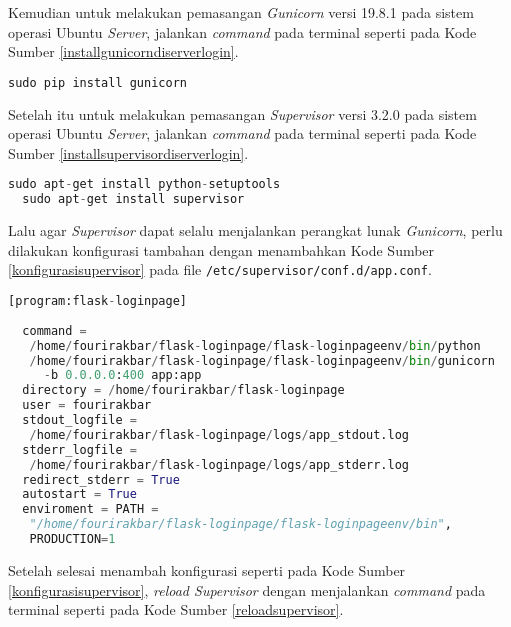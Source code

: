   Kemudian untuk melakukan pemasangan \textit{Gunicorn} versi 19.8.1 pada sistem operasi Ubuntu \textit{Server}, jalankan \textit{command} pada terminal seperti pada Kode Sumber \ref{installgunicorndiserverlogin}.\\
  \begin{minipage}{\linewidth}
  \begin{lstlisting}[caption=Command untuk installasi Gunicorn,language=Python,label=installgunicorndiserverlogin]
  sudo pip install gunicorn
  \end{lstlisting}
  \end{minipage}

  Setelah itu untuk melakukan pemasangan \textit{Supervisor} versi 3.2.0 pada sistem operasi Ubuntu \textit{Server}, jalankan \textit{command} pada terminal seperti pada Kode Sumber \ref{installsupervisordiserverlogin}.\\
  \begin{minipage}{\linewidth}
  \begin{lstlisting}[caption=Command untuk installasi Supervisor,language=Python,label=installsupervisordiserverlogin]
  sudo apt-get install python-setuptools
  sudo apt-get install supervisor
  \end{lstlisting}
  \end{minipage}
  Lalu agar \textit{Supervisor} dapat selalu menjalankan perangkat lunak \textit{Gunicorn}, perlu dilakukan konfigurasi tambahan dengan menambahkan Kode Sumber \ref{konfigurasisupervisor} pada file \texttt{/etc/supervisor/conf.d/app.conf}.\\
  \begin{minipage}{\linewidth}
  \begin{lstlisting}[caption=Konfigurasi tambahan Supervisor,language=Python,label=konfigurasisupervisor]
  [program:flask-loginpage]
  
  command = 
   /home/fourirakbar/flask-loginpage/flask-loginpageenv/bin/python 
   /home/fourirakbar/flask-loginpage/flask-loginpageenv/bin/gunicorn 
     -b 0.0.0.0:400 app:app
  directory = /home/fourirakbar/flask-loginpage
  user = fourirakbar
  stdout_logfile = 
   /home/fourirakbar/flask-loginpage/logs/app_stdout.log
  stderr_logfile =
   /home/fourirakbar/flask-loginpage/logs/app_stderr.log
  redirect_stderr = True
  autostart = True
  enviroment = PATH = 
   "/home/fourirakbar/flask-loginpage/flask-loginpageenv/bin", 
   PRODUCTION=1
  \end{lstlisting}
  \end{minipage}
  Setelah selesai menambah konfigurasi seperti pada Kode Sumber \ref{konfigurasisupervisor}, \textit{reload Supervisor} dengan menjalankan \textit{command} pada terminal seperti pada Kode Sumber \ref{reloadsupervisor}.\\ 
